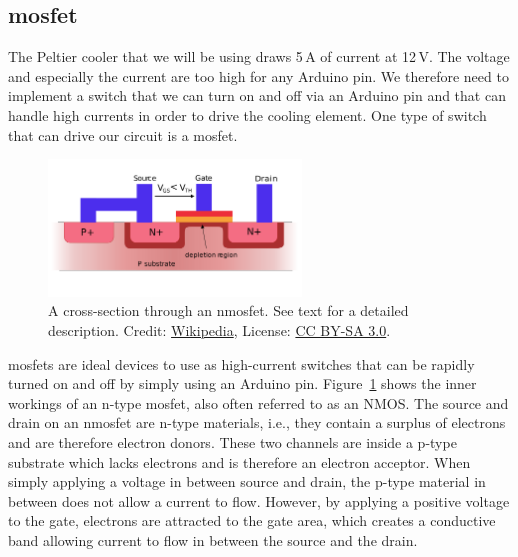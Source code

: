 \subsection{\acs{mosfet}}

The Peltier cooler that we will be using draws 5\,A of current at 12\,V. The voltage and especially the current are too high for any Arduino pin. We therefore need to implement a switch that we can turn on and off via an Arduino pin and that can handle high currents in order to drive the cooling element. One type of switch that can drive our circuit is a \acf{mosfet}.


 \begin{figure}[bt]
     \centering
     \includegraphics[width=0.6\textwidth]{graphics/04_peltier/nMOSFET.png}
     \caption{A cross-section through an n\ac{mosfet}. See text for a detailed description. Credit: \href{https://en.wikipedia.org/wiki/MOSFET\#/media/File:MOSFET_functioning_body.svg}{Wikipedia}, License: \href{https://creativecommons.org/licenses/by-sa/3.0/}{CC BY-SA 3.0}.}
     \label{fig:peltier:nmosfet}
 \end{figure}
 \Acp{mosfet} are ideal devices to use as high-current switches that can be rapidly turned on and off by simply using an Arduino pin.
Figure~\ref{fig:peltier:nmosfet} shows the inner workings of an n-type \ac{mosfet}, also often referred to as an NMOS. The source and drain on an n\ac{mosfet} are n-type materials, i.e., they contain a surplus of electrons and are therefore electron donors. These two channels are inside a p-type substrate which lacks electrons and is therefore an electron acceptor. When simply applying a voltage in between source and drain, the p-type material in between does not allow a current to flow. However, by applying a positive voltage to the gate, electrons are attracted to the gate area, which creates a conductive band allowing current to flow in between the source and the drain.

